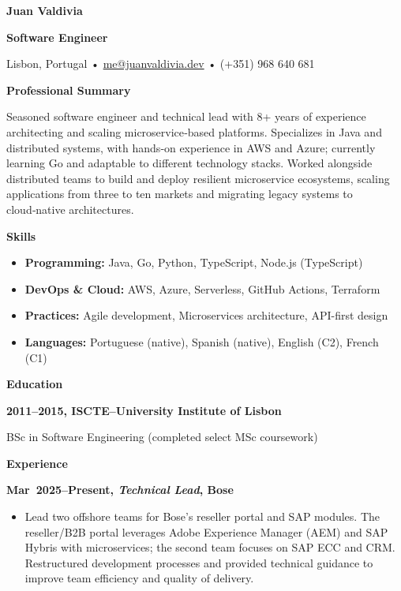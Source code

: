 \documentclass[a4paper,12pt]{memoir}
\newcommand{\cvheading}[1]{{\Large\bfseries\color{RoyalBlue} #1} \par\vspace{.6\baselineskip}}
\newcommand{\cvsubheading}[1]{{\large\bfseries #1} \bigbreak}
\newcommand{\Sep}{\vspace{1em}}
\newcommand{\SmallSep}{\vspace{0.5em}}
\newcommand{\CVSection}[1]{{\large\textbf{#1}}\par\SmallSep}
\newcommand{\CVItem}[2]{\textbf{\color{RoyalBlue} #1}\par\small{#2}\SmallSep}
\begin{document}
\cvheading{Juan Valdivia}
\cvsubheading{Software Engineer}

\small{Lisbon, Portugal • \url{me@juanvaldivia.dev} • (+351) 968 640 681}\\
\SmallSep

\CVSection{Professional Summary}
Seasoned software engineer and technical lead with 8+ years of experience architecting and scaling microservice‑based platforms. Specializes in Java and distributed systems, with hands‑on experience in AWS and Azure; currently learning Go and adaptable to different technology stacks. Worked alongside distributed teams to build and deploy resilient microservice ecosystems, scaling applications from three to ten markets and migrating legacy systems to cloud‑native architectures.
\Sep

\CVSection{Skills}
\begin{itemize}[leftmargin=*,label={•}]
    \item \textbf{Programming:} Java, Go, Python, TypeScript, Node.js (TypeScript)
    \item \textbf{DevOps \& Cloud:} AWS, Azure, Serverless, GitHub Actions, Terraform
    \item \textbf{Practices:} Agile development, Microservices architecture, API-first design
    \item \textbf{Languages:} Portuguese (native), Spanish (native), English (C2), French (C1)
\end{itemize}
\Sep



\CVSection{Education}
\CVItem{2011--2015, ISCTE–University Institute of Lisbon}{BSc in Software Engineering (completed select MSc coursework)}
\Sep

\CVSection{Experience}
\CVItem{Mar 2025–Present, \textit{Technical Lead}, Bose}{
\begin{itemize}[leftmargin=*,label={•}]
    \item Lead two offshore teams for Bose’s reseller portal and SAP modules. The reseller/B2B portal leverages Adobe Experience Manager (AEM) and SAP Hybris with microservices; the second team focuses on SAP ECC and CRM. Restructured development processes and provided technical guidance to improve team efficiency and quality of delivery.
\end{itemize}
}
\end{document}
